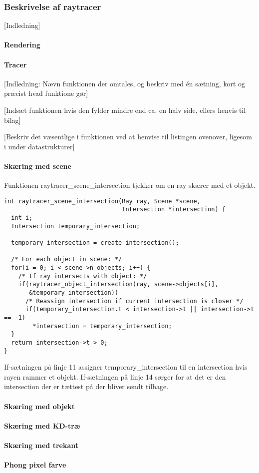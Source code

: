 \subsubsection{Beskrivelse af raytracer}
[Indledning]
\paragraph{Rendering}

\paragraph{Tracer}
[Indledning: Nævn funktionen der omtales, og beskriv med én sætning, kort og præcist hvad funktione gør]

[Indsæt funktionen hvis den fylder mindre end ca. en halv side, ellers henvis til bilag]

[Beskriv det væsentlige i funktionen ved at henvise til listingen ovenover, ligesom i under datastrukturer]
 
\paragraph{Skæring med scene}

Funktionen raytracer\_scene\_intersection tjekker om en ray skærer med et objekt.

\begin{lstlisting}[style=Cstyle, caption=Structs til objektet]
int raytracer_scene_intersection(Ray ray, Scene *scene, 
                                 Intersection *intersection) {
  int i;
  Intersection temporary_intersection;

  temporary_intersection = create_intersection();

  /* For each object in scene: */
  for(i = 0; i < scene->n_objects; i++) {
    /* If ray intersects with object: */
    if(raytracer_object_intersection(ray, scene->objects[i], 
       &temporary_intersection))
      /* Reassign intersection if current intersection is closer */
      if(temporary_intersection.t < intersection->t || intersection->t == -1)
        *intersection = temporary_intersection;
  }
  return intersection->t > 0;
}
\end{lstlisting}

If-sætningen på linje 11 assigner temporary\_intersection til en intersection hvis rayen rammer et objekt. If-sætningen på linje 14 sørger for at det er den intersection der er tættest på der bliver sendt tilbage. 


\paragraph{Skæring med objekt}

\paragraph{Skæring med KD-træ}

\paragraph{Skæring med trekant}

\paragraph{Phong pixel farve}



